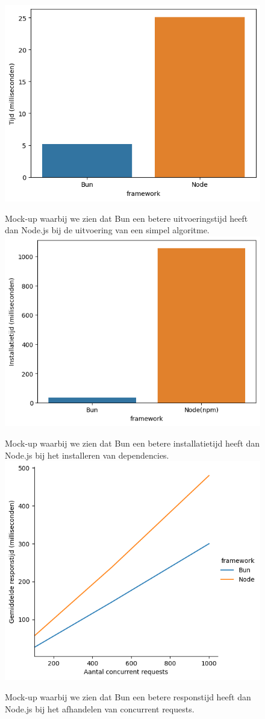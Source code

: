 \begin{figure}
    \centering
    \includegraphics[width=.4\textwidth]{graphics/diagram.png}
    \caption{\label{fig:uitvoeringstijd}}Mock-up waarbij we zien dat Bun een betere uitvoeringstijd heeft dan Node.js bij de uitvoering van een simpel algoritme.
    \includegraphics[width=.4\textwidth]{graphics/installatietijd.png}
    \caption{\label{fig:installatietijd}}Mock-up waarbij we zien dat Bun een betere installatietijd heeft dan Node.js bij het installeren van dependencies.
    \includegraphics[width=.4\textwidth]{graphics/Responstijd.png}
    \caption{\label{fig:responstijd}}Mock-up waarbij we zien dat Bun een betere responstijd heeft dan Node.js bij het afhandelen van concurrent requests.
\end{figure}
